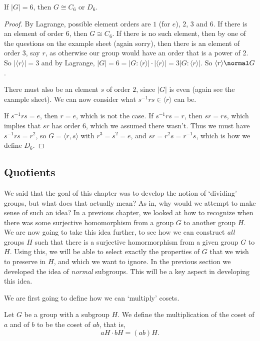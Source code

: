 \documentclass[a4paper]{scrartcl}
\begin{document}
\begin{proposition}
	If $|G| = 6$, then $G \cong C_6$ or $D_6$.
\end{proposition}
\begin{proof}
	By Lagrange, possible element orders are $1$ (for $e$), $2$, $3$ and $6$. If there is an element of order 6, then $G \cong C_6$. If there is no such element, then by one of the questions on the example sheet (again sorry), then there is an element of order $3$, say $r$, as otherwise our group would have an order that is a power of 2. So $|\langle r \rangle| = 3$ and by Lagrange, $|G| = 6 = |G: \langle r \rangle| \cdot |\langle r \rangle| = 3 |G: \langle r \rangle|$. So $\langle r \rangle \normal G$.

	There must also be an element $s$ of order $2$, since $|G|$ is even (again see the example sheet). We can now consider what $s^{-1} r s \in \langle r \rangle$ can be.

	If $s^{-1} r s = e$, then $r = e$, which is not the case. If $s^{-1} r s = r$, then $sr = rs$, which implies that $sr$ has order 6, which we assumed there wasn't. Thus we must have $s^{-1} r s = r^2$, so $G = \langle r, s \rangle$ with $r^3 = s^2 = e$, and $sr = r^2 s = r^{-1}s$, which is how we define $D_6$.
\end{proof}

\subsection{Quotients}

We said that the goal of this chapter was to develop the notion of `dividing' groups, but what does that actually mean? As in, why would we attempt to make sense of such an idea?
In a previous chapter, we looked at how to recognize when there was some surjective homomorphism from a group $G$ to another group $H$.
We are now going to take this idea further, to see how we can construct \emph{all} groups $H$ such that there is a surjective homormorphism from a given group $G$ to $H$.
Using this, we will be able to select exactly the properties of $G$ that we wish to preserve in $H$, and which we want to ignore.
In the previous section we developed the idea of \emph{normal} subgroups. This will be a key aspect in developing this idea.

We are first going to define how we can `multiply' cosets.

\begin{definition}
Let $G$ be a group with a subgroup $H$. We define the multiplication of the coset of $a$ and of $b$ to be the coset of $ab$, that is,
$$
aH \cdot bH = (ab)H.
$$
\end{definition}
\end{document}
